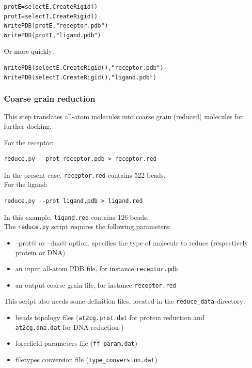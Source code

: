 \documentclass[12pt,a4paper]{article}
\begin{document}
\begin{verbatim}
protE=selectE.CreateRigid()
protI=selectI.CreateRigid()
WritePDB(protE,"receptor.pdb")
WritePDB(protI,"ligand.pdb")
\end{verbatim}
Or more quickly:
\begin{verbatim}
WritePDB(selectE.CreateRigid(),"receptor.pdb")
WritePDB(selectI.CreateRigid(),"ligand.pdb")
\end{verbatim}

\subsubsection{Coarse grain reduction}

This step translates all-atom molecules into coarse grain (reduced) molecules for further docking. 

For the receptor: 
\begin{verbatim}
reduce.py --prot receptor.pdb > receptor.red
\end{verbatim}
In the present case, {\tt receptor.red} contains 522 beads.\\

For the ligand:
\begin{verbatim}
reduce.py --prot ligand.pdb > ligand.red
\end{verbatim}
In this example, {\tt ligand.red} contains 126 beads. \\

The {\tt reduce.py} script requires the following parameters:

\begin{itemize}
\item \verb@--prot@ or \verb@--dna@ option, specifies the type of molecule to reduce (respectively protein or DNA)
\item an input all-atom PDB file, for instance {\tt receptor.pdb}
\item an output coarse grain file, for instance {\tt receptor.red}
\end{itemize}

This script also needs some definition files, located in the \verb=reduce_data= directory:

\begin{itemize}
\item beads topology files ({\tt at2cg.prot.dat} for protein reduction and {\tt at2cg.dna.dat} for DNA reduction )
\item forcefield parameters file ({\tt ff\_param.dat})
\item filetypes conversion file ({\tt type\_conversion.dat})
\end{itemize}
\end{document}

